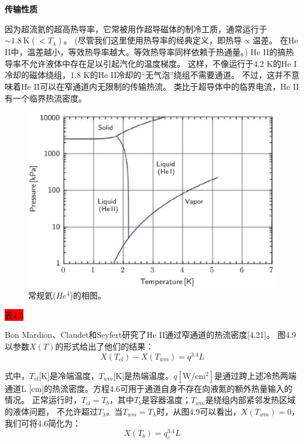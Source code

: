 \textbf{传输性质}

因为超流氦的超高热导率，它常被用作超导磁体的制冷工质，通常运行于$\sim 1.8\ \mathrm{K}(<T_\lambda)$。
(尽管我们这里使用热导率的经典定义，即热导$\propto$温差。
在He II中，温差越小，等效热导率越大。等效热导率同样依赖于热通量。)
He II的搞热导率不允许液体中存在足以引起汽化的温度梯度。
这样，不像运行于4.2 K的He I冷却的磁体绕组，1.8 K的He II冷却的“无气泡”绕组不需要通道。
不过，这并不意味着He II可以在窄通道内无限制的传输热流。
类比于超导体中的临界电流，He II有一个临界热流密度。

\begin{figure}[htbp]
	\centering
	\includegraphics[scale=0.5]{chpt4/figs/fig4.8.eps}
	\caption{常规氦($He^4$)的相图。}
\end{figure}

\colorbox{red}{表4.6}

Bon Mardion、Claudet和Seyfert研究了He II通过窄通道的热流密度[4.21]。
图4.9以参数$X(T)$的形式给出了他们的结果：
\begin{equation}%
X(T_{cl})-X(T_{wm})=q^{3.4}L
\end{equation}

式中，$T_{cl}$[K]是冷端温度，$T_{wm}$[K]是热端温度。$q[\mathrm{W/cm^2}]$是通过跨上述冷热两端
通道L [cm]的热流密度。方程4.6可用于通道自身不存在向液氮的额外热量输入的情况。
正常运行时，$T_{cl} = T_b$，其中$T_{b}$是容器温度；$T_{wm}$是绕组内部紧邻发热区域的液体问题，
不允许超过$T_\lambda$。当$T_{wm}=T_\lambda$时，从图4.9可以看出，$X(T_{wm})=0$，我们可将4.6简化为：
\begin{equation*}%
X(T_b)=q_{c}^{3.4}L \tag{4.6b}
\end{equation*}

